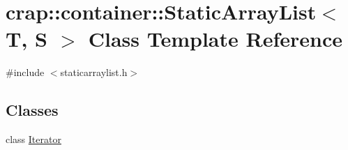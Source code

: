 \hypertarget{classcrap_1_1container_1_1_static_array_list}{\section{crap\-:\-:container\-:\-:Static\-Array\-List$<$ T, S $>$ Class Template Reference}
\label{classcrap_1_1container_1_1_static_array_list}
}


{\ttfamily \#include $<$staticarraylist.\-h$>$}

\subsection*{Classes}
\begin{DoxyCompactItemize}
\item 
class \hyperlink{classcrap_1_1container_1_1_static_array_list_1_1_iterator}{Iterator}
\end{DoxyCompactItemize}
